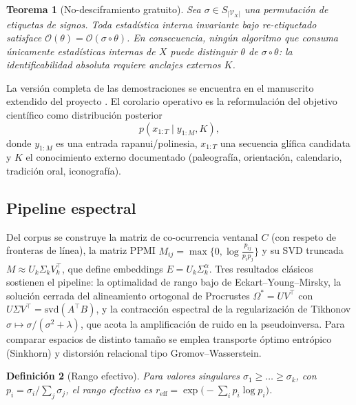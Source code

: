 \documentclass[10pt,twocolumn]{article}
\newtheorem{theorem}{Teorema}[section]
\newtheorem{definition}[theorem]{Definición}
\begin{document}
\begin{theorem}[No-desciframiento gratuito]
\label{thm:nofree}
Sea $\sigma\in S_{|\mathcal{V}_X|}$ una permutación de etiquetas de
signos. Toda estadística interna invariante bajo re-etiquetado satisface
$\mathcal{O}(\theta)=\mathcal{O}(\sigma\circ\theta)$. En consecuencia,
ningún algoritmo que consuma únicamente estadísticas internas de $X$
puede distinguir $\theta$ de $\sigma\circ\theta$: la identificabilidad
absoluta requiere anclajes externos $K$.
\end{theorem}

La versión completa de las demostraciones se encuentra en el manuscrito
extendido del proyecto \cite{astudillo2026}. El corolario operativo es la
reformulación del objetivo científico como distribución posterior
\begin{equation}
p\!\left(x_{1:T}\mid y_{1:M},K\right),
\label{eq:posterior}
\end{equation}
donde $y_{1:M}$ es una entrada rapanui/polinesia, $x_{1:T}$ una secuencia
glífica candidata y $K$ el conocimiento externo documentado (paleografía,
orientación, calendario, tradición oral, iconografía).

\subsection{Pipeline espectral}

Del corpus se construye la matriz de co-ocurrencia ventanal $C$ (con
respeto de fronteras de línea), la matriz PPMI
$M_{ij}=\max\{0,\log\frac{p_{ij}}{p_i p_j}\}$ y su SVD truncada
$M\approx U_k\Sigma_k V_k^{\top}$, que define embeddings
$E=U_k\Sigma_k^{\alpha}$. Tres resultados clásicos sostienen el pipeline:
la optimalidad de rango bajo de Eckart--Young--Mirsky, la solución
cerrada del alineamiento ortogonal de Procrustes
$\Omega^{*}=UV^{\top}$ con $U\Sigma V^{\top}=\mathrm{svd}(A^{\top}B)$, y
la contracción espectral de la regularización de Tikhonov
$\sigma\mapsto\sigma/(\sigma^2+\lambda)$, que acota la amplificación de
ruido en la pseudoinversa. Para comparar espacios de distinto tamaño se
emplea transporte óptimo entrópico (Sinkhorn) y distorsión relacional
tipo Gromov--Wasserstein.

\begin{definition}[Rango efectivo]
Para valores singulares $\sigma_1\ge\dots\ge\sigma_k$, con
$p_i=\sigma_i/\sum_j\sigma_j$, el rango efectivo es
$r_{\mathrm{eff}}=\exp\!\big(-\sum_i p_i\log p_i\big)$.
\end{definition}
\end{document}
